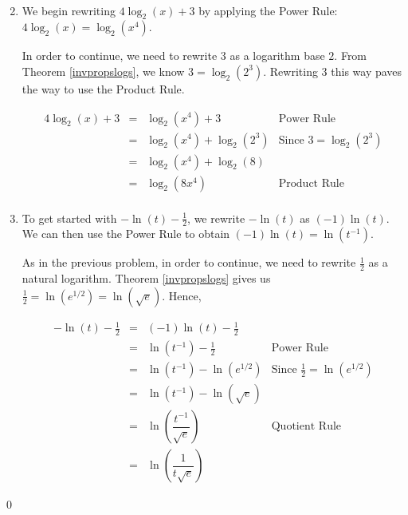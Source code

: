 \begin{ex}
\begin{enumerate}
\[\begin{array}{rclr}
                            
\end{array}\]
\setlength{\extrarowheight}{2pt}

\item  We begin rewriting $4\log_{2}(x) + 3$ by applying the Power Rule:  $4\log_{2}(x) = \log_{2}\left(x^4\right)$.

In order to continue, we need to rewrite $3$ as a logarithm base $2$.  From Theorem \ref{invpropslogs}, we know $3 = \log_{2}\left(2^3\right)$.  Rewriting $3$ this way paves the way to use the Product Rule.

\setlength{\extrarowheight}{4pt}
\[ \begin{array}{rclr}

4\log_{2}(x) + 3 & = & \log_{2}\left(x^4\right) + 3  & \mbox{Power Rule} \\ 
                             & = & \log_{2}\left(x^4\right) + \log_{2}\left(2^3\right)& \mbox{Since $3 = \log_{2}\left(2^3\right)$} \\
                             & = & \log_{2}\left(x^4\right) + \log_{2}(8)& \\
                             & = & \log_{2}\left( 8x^4\right) & \mbox{Product Rule} \\
                             
                            
\end{array}\]
\setlength{\extrarowheight}{2pt}

\item To get started with $-\ln(t) - \frac{1}{2}$, we rewrite  $-\ln(t)$ as $(-1) \ln(t)$.  We can then use the Power Rule to obtain $(-1)\ln(t) = \ln\left(t^{-1}\right)$.

As in the previous problem, in order to continue, we need to rewrite $\frac{1}{2}$ as a natural logarithm. Theorem \ref{invpropslogs} gives us $\frac{1}{2} = \ln\left(e^{1/2}\right) = \ln\left(\sqrt{e}\right)$.  Hence,

\setlength{\extrarowheight}{6pt}
\[ \begin{array}{rclr}

-\ln(t) - \frac{1}{2} & = & (-1)\ln(t) - \frac{1}{2}  &  \\ 
                             & = & \ln\left(t^{-1}\right) - \frac{1}{2} & \mbox{Power Rule} \\
                             & = & \ln\left(t^{-1}\right) - \ln\left(e^{1/2}\right)& \mbox{Since $\frac{1}{2} = \ln\left(e^{1/2}\right)$} \\
                             & = & \ln\left(t^{-1}\right) - \ln\left(\sqrt{e} \right)& \\ [6pt]
                             & = & \ln\left(\dfrac{t^{-1}}{\sqrt{e}}\right) & \mbox{Quotient Rule} \\ [10pt]
                             & = & \ln\left(\dfrac{1}{t\sqrt{e}}\right) &
\end{array}\]
\setlength{\extrarowheight}{2pt}

\end{enumerate}

\vspace{-.3in} \qed

\end{ex}

